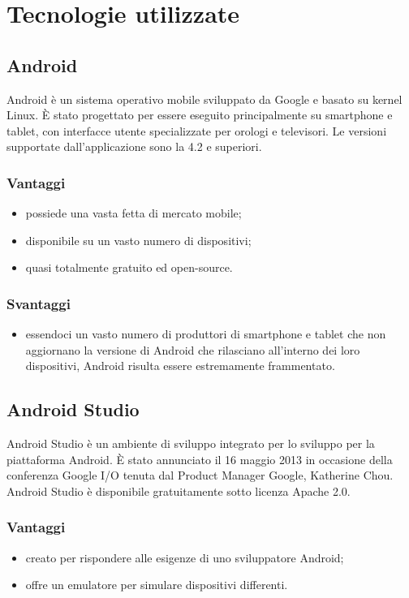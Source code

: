 \documentclass[../Tesi.tex]{subfiles}
\begin{document}
\section{Tecnologie utilizzate}
	
	\subsection{Android}
		Android è un sistema operativo mobile sviluppato da Google e basato su kernel Linux. È stato progettato per essere eseguito principalmente su smartphone e tablet, con interfacce utente specializzate per orologi e televisori. Le versioni supportate dall'applicazione sono la 4.2 e superiori.
		\subsubsection{Vantaggi}
			\begin{itemize}
				\item possiede una vasta fetta di mercato mobile;
				\item disponibile su un vasto numero di dispositivi;
				\item quasi totalmente gratuito ed open-source.
			\end{itemize}
		\subsubsection{Svantaggi}
			\begin{itemize}
				\item essendoci un vasto numero di produttori di smartphone e tablet che non aggiornano la versione di Android che rilasciano all'interno dei loro dispositivi, Android risulta essere estremamente frammentato.
			\end{itemize}
	
	\subsection{Android Studio}
	Android Studio è un ambiente di sviluppo integrato per lo sviluppo per la piattaforma Android. È stato annunciato il 16 maggio 2013 in occasione della conferenza Google I/O tenuta dal Product Manager Google, Katherine Chou. Android Studio è disponibile gratuitamente sotto licenza Apache 2.0.
		\subsubsection{Vantaggi}
			\begin{itemize}
				\item creato per rispondere alle esigenze di uno sviluppatore Android;
				\item offre un emulatore per simulare dispositivi differenti.
			\end{itemize}
\end{document}
